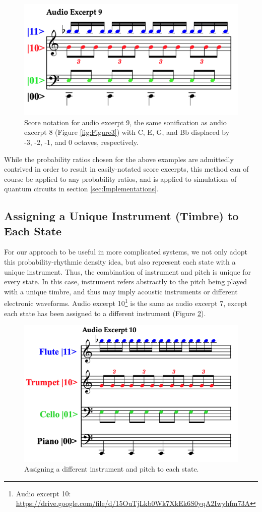 \documentclass[10pt,twocolumn]{article}
\begin{document}
\begin{figure}[h]
\centering
  \includegraphics[width=.45\textwidth]{fig/Figure 4.png}
        \caption{Score notation for audio excerpt 9, the same sonification as audio excerpt 8 (Figure \ref{fig:Figure3}) with C, E, G, and Bb displaced by -3, -2, -1, and 0 octaves, respectively.}
\label{fig:Figure4}
\end{figure}

While the probability ratios chosen for the above examples are admittedly contrived in order to result in easily-notated score excerpts, this method can of course be applied to any probability ratios, and is applied to simulations of quantum circuits in section \ref{sec:Implementations}.

\subsection{Assigning a Unique Instrument (Timbre) to Each State}

For our approach to be useful in more complicated systems, we not only adopt this probability-rhythmic density idea, but also represent each state with a unique instrument. Thus, the combination of instrument and pitch is unique for every state. In this case, instrument refers abstractly to the pitch being played with a unique timbre, and thus may imply acoustic instruments or different electronic waveforms. Audio excerpt 10\footnote{Audio excerpt 10: \url{https://drive.google.com/file/d/15OuTjLkb0Wk7XkEk6S0yqA2Iwyhfm73A}} is the same as audio excerpt 7, except each state has been assigned to a different instrument (Figure \ref{fig:Figure5}).

\begin{figure}[h]
\centering
  \includegraphics[width=.45\textwidth]{fig/Figure 5.png}
        \caption{Assigning a different instrument and pitch to each state.}
\label{fig:Figure5}
\end{figure}
\end{document}
